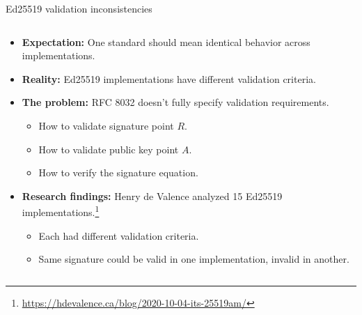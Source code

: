 \documentclass[aspectratio=169, lualatex, handout]{beamer}
\begin{document}
\begin{frame}{Ed25519 validation inconsistencies}
	\begin{columns}[c]
		\begin{column}{1\textwidth}
			\begin{itemize}[<+->]
				\item \textbf{Expectation:} One standard should mean identical behavior across implementations.
				\item \textbf{Reality:} Ed25519 implementations have different validation criteria.
				\item \textbf{The problem:} RFC 8032 doesn't fully specify validation requirements.
				      \begin{itemize}
					      \item How to validate signature point $R$.
					      \item How to validate public key point $A$.
					      \item How to verify the signature equation.
				      \end{itemize}
				\item \textbf{Research findings:} Henry de Valence analyzed 15 Ed25519 implementations.\footnote{\url{https://hdevalence.ca/blog/2020-10-04-its-25519am/}}
				      \begin{itemize}
					      \item Each had different validation criteria.
					      \item Same signature could be valid in one implementation, invalid in another.
				      \end{itemize}
			\end{itemize}
		\end{column}
	\end{columns}
\end{frame}
\end{document}

